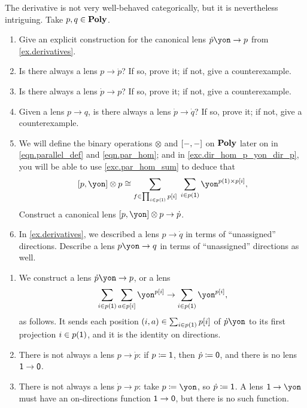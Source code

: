 \documentclass[Book-Poly]{subfiles}
\begin{document}
\begin{exercise} \label{exc.deriv-ops}
The derivative is not very well-behaved categorically, but it is nevertheless intriguing.
Take $p,q\in\mathbf{Poly}$.
\begin{enumerate}
	\item Give an explicit construction for the canonical lens $\dot{p}\yon\to p$ from \cref{ex.derivatives}.
	\item Is there always a lens $p\to \dot{p}$?
  If so, prove it; if not, give a counterexample.
	\item Is there always a lens $\dot{p}\to p$?
  If so, prove it; if not, give a counterexample.
	\item Given a lens $p\to q$, is there always a lens $\dot{p}\to\dot{q}$?
  If so, prove it; if not, give a counterexample.
	\item We will define the binary operations $\otimes$ and $[-,-]$ on $\mathbf{Poly}$ later on in \eqref{eqn.parallel_def} and \eqref{eqn.par_hom}; and in \cref{exc.dir_hom_p_yon_dir_p}, you will be able to use \cref{exc.par_hom_sum} to deduce that
	\begin{equation} \label{eqn.dir_hom_p_yon_dir_p}
	    \ihom{p, \yon} \otimes p \iso \sum_{f \in \prod_{i \in p(\1)} p[i]} \; \sum_{i \in p(\1)} \yon^{p(\1) \times p[i]},
	\end{equation}
	Construct a canonical lens $\ihom{p,\yon}\otimes p\to \dot{p}$.
	\item In \cref{ex.derivatives}, we described a lens $p\to\dot{q}$ in terms of ``unassigned'' directions. Describe a lens $p\yon\to q$ in terms of ``unassigned'' directions as well.
	\qedhere
\end{enumerate}
\begin{solution}
\begin{enumerate}
  \item We construct a lens $\dot{p}\yon\to p$, or a lens
  \[
    \sum_{i\in p(\1)}\sum_{a\in p[i]}\yon^{p[i]}\to\sum_{i\in p(\1)}\yon^{p[i]},
  \]
  as follows.
  It sends each position $(i,a)\in\sum_{i\in p(\textsf{1})}p[i]$ of $\dot{p}\yon$ to its first projection $i\in p(\textsf{1})$, and it is the identity on directions.

	\item There is not always a lens $p\to \dot{p}$: if $p\coloneqq\textsf{1}$, then $\dot{p}\coloneqq\textsf{0}$, and there is no lens $\textsf{1}\to\textsf{0}$.

	\item There is not always a lens $\dot{p}\to p$: take $p\coloneqq\yon$, so $\dot{p}\coloneqq\textsf{1}$.
	A lens $\1\to\yon$ must have an on-directions function $\textsf{1}\to\textsf{0}$, but there is no such function.


\end{enumerate}
\end{solution}
\end{exercise}
\end{document}
